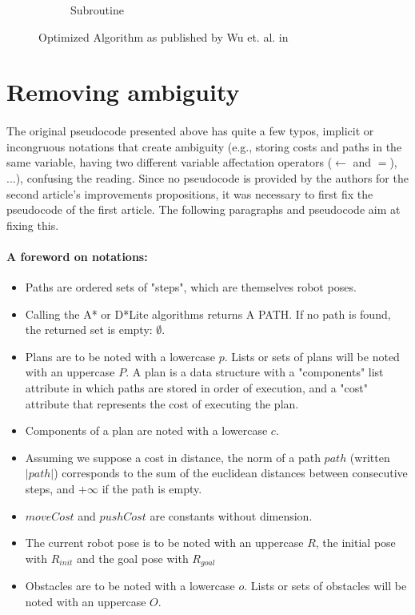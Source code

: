\begin{figure}[H]
\begin{subfigure}{.5\textwidth}
  \caption{Subroutine}
  \label{fig:Wu_Original_Algorithm-algo4}
\end{subfigure}
\caption{Optimized Algorithm as published by Wu et. al. in \parencite{wu_navigation_2010}}
\label{fig:Wu_Original_Algorithm-optimized}
\end{figure}

\clearpage

\section{Removing ambiguity}
\paragraph{} The original pseudocode presented above has quite a few typos, implicit or incongruous notations that create ambiguity (e.g., storing costs and paths in the same variable, having two different variable affectation operators ($\gets$ and $=$), ...), confusing the reading. Since no pseudocode is provided by the authors for the second article's improvements propositions, it was necessary to first fix the pseudocode of the first article. The following paragraphs and pseudocode aim at fixing this.

\paragraph{A foreword on notations:}

\begin{itemize}
  \item Paths are ordered sets of "steps", which are themselves robot poses.
  \item Calling the A* or D*Lite algorithms returns A PATH. If no path is found, the returned set is empty: $\emptyset$.
  \item Plans are to be noted with a lowercase $p$. Lists or sets of plans will be noted with an uppercase $P$. A plan is a data structure with a "components" list attribute in which paths are stored in order of execution, and a "cost" attribute that represents the cost of executing the plan.
  \item Components of a plan are noted with a lowercase $c$.
  \item Assuming we suppose a cost in distance, the norm of a path $path$ (written $|path|$) corresponds to the sum of the euclidean distances between consecutive steps, and $+\infty$ if the path is empty.
  \item $moveCost$ and $pushCost$ are constants without dimension.
  \item The current robot pose is to be noted with an uppercase $R$, the initial pose with $R_{init}$ and the goal pose with $R_{goal}$
  \item Obstacles are to be noted with a lowercase $o$. Lists or sets of obstacles will be noted with an uppercase $O$.
\end{itemize}

